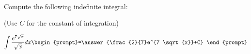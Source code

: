 \documentclass{ximera}
\author{Jim Talamo}
\begin{document}
\begin{exercise}
Compute the following indefinite integral:

\begin{prompt} (Use $C$ for the constant of integration) \end{prompt} 

\[
\int \frac{e^{7\sqrt{x}}}{\sqrt{x}} dx 
\begin{prompt}=\answer{\frac{2}{7}e^{7 \sqrt{x}}+C} \end{prompt}
\]
\end{exercise}
\end{document}
